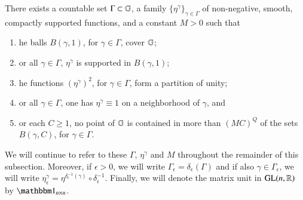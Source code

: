 \documentclass[leqno]{amsart}
\begin{document}
	\begin{lemma}\label{bd multiplicity covering}
		There exists a countable set $\Gamma\subset\mathbb{G}$, a family $\{\eta^\gamma\}_{\gamma\in\Gamma}$ of non-negative, smooth, compactly supported functions, and a constant $M>0$ such that
		\begin{enumerate}
			\item {}he balls $B(\gamma,1)$, for ${\gamma\in\Gamma}$, cover $\mathbb{G}$;
			\item {}or all $\gamma\in\Gamma$, $\eta^\gamma$ is supported in $B(\gamma, 1)$;
			\item {}he functions $(\eta^\gamma)^2$, for $\gamma\in\Gamma$, form a partition of unity;
			\item {}or all $\gamma\in\Gamma$, one has $\eta^\gamma\equiv 1$ on a neighborhood of $\gamma$, and
			\item {}or each $C\geq 1$, no point of $\mathbb{G}$ is contained in more than $(MC)^Q$ of the sets $B(\gamma, C)$, for ${\gamma\in\Gamma}$.
		\end{enumerate}
	\end{lemma}
	We will continue to refer to these $\Gamma$, $\eta^\gamma$ and $M$ throughout the remainder of this subsection. Moreover, if $\epsilon>0$, we will write $\Gamma_\epsilon=\delta_\epsilon(\Gamma)$ and if also $\gamma\in\Gamma_\epsilon$, we will write $\eta^\gamma_\epsilon=\eta^{\delta_\epsilon^{-1}(\gamma)}\circ\delta_{\epsilon}^{-1}$. Finally, we will denote the matrix unit in ${\rm GL}(n,\mathbb{R})$ by $\unit_{n\times n}$.
	
\end{document}
